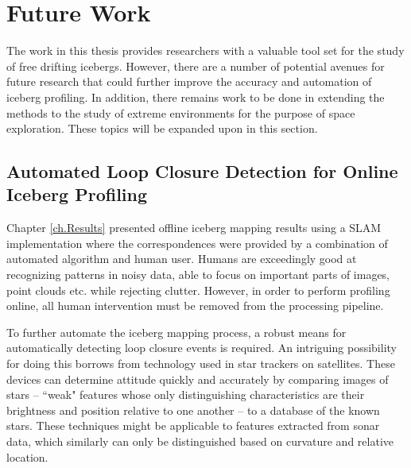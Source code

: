 \section{Future Work}

The work in this thesis provides researchers with a valuable tool set for the study of free drifting icebergs. However, there  are a number of potential avenues for future research that could further improve the accuracy and automation of iceberg profiling. In addition, there remains work to be done in extending the methods to the study of extreme environments for the purpose of space exploration. 
These topics will be expanded upon in this section. 


\subsection{Automated Loop Closure Detection for Online Iceberg Profiling}
Chapter \ref{ch.Results} presented offline iceberg mapping results using a SLAM implementation where the correspondences were provided by a combination of automated algorithm and human user. Humans are exceedingly good at recognizing patterns in noisy data, able to focus on important parts of images, point clouds etc. while rejecting clutter. However, in order to perform profiling online, all human intervention must be removed from the processing pipeline. 

To further automate the iceberg mapping process, a robust means for automatically detecting loop closure events is required. An intriguing possibility for doing this borrows from technology used in star trackers on satellites. These devices can determine attitude quickly and accurately by comparing images of stars -- ``weak" features whose only distinguishing characteristics are their brightness and position relative to one another -- to a database of the known stars. These techniques might be applicable to features extracted from sonar data, which similarly can only be distinguished based on curvature and relative location. 

